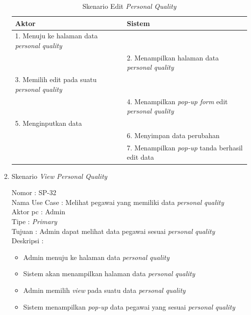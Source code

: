 \begin{enumerate}
\begin{itemize}
\end{itemize}

\begin{table}
	\caption{Skenario Edit \textit{Personal Quality}}
	\centering
	\begin{tabular}{ | l | p{54.5mm} |}
		\hline 
		\textbf{Aktor} & \textbf{Sistem} \\
		\hline
		
		1.	Menuju ke halaman data \textit{personal quality} &  \\
		
		\hline
		
		&  2.	Menampilkan halaman data \textit{personal quality} \\
		
		\hline
		
		3. Memilih edit pada suatu \textit{personal quality} & \\
		
		\hline
		
		& 4.	Menampilkan\textit{ pop-up form} edit \textit{personal quality} \\
		
		\hline
		
		5.	Menginputkan data  & \\
		\hline
		
		& 6.	Menyimpan data perubahan \\
		\hline
		
		& 7.	Menampilkan\textit{ pop-up }tanda berhasil edit data \\
		\hline
		
	\end{tabular}
\end{table}

\item Skenario \textit{View Personal Quality}

Nomor \kern 3.6pc : SP-32 \\
Nama Use Case : Melihat pegawai yang memiliki data \textit{personal quality} \\
Aktor  pc : Admin \\
Tipe \kern 4.6pc : \textit{Primary} \\
Tujuan \kern 3.6pc : Admin dapat melihat data pegawai sesuai \textit{personal quality} \\
Deskripsi \kern 2.5pc : 

\begin{itemize}
	\item Admin menuju ke halaman data \textit{personal quality}
	\item Sistem akan menampilkan halaman data \textit{personal quality}
	\item Admin memilih \textit{view} pada suatu data \textit{personal quality}
	\item Sistem menampilkan \textit{pop-up} data pegawai yang sesuai \textit{personal quality}
	

\end{itemize}
\end{enumerate}
